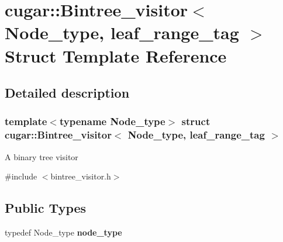 \hypertarget{structcugar_1_1_bintree__visitor_3_01_node__type_00_01leaf__range__tag_01_4}{}\section{cugar\+:\+:Bintree\+\_\+visitor$<$ Node\+\_\+type, leaf\+\_\+range\+\_\+tag $>$ Struct Template Reference}
\label{structcugar_1_1_bintree__visitor_3_01_node__type_00_01leaf__range__tag_01_4}


\subsection{Detailed description}
\subsubsection*{template$<$typename Node\+\_\+type$>$\newline
struct cugar\+::\+Bintree\+\_\+visitor$<$ Node\+\_\+type, leaf\+\_\+range\+\_\+tag $>$}

A binary tree visitor 

{\ttfamily \#include $<$bintree\+\_\+visitor.\+h$>$}

\subsection*{Public Types}
\begin{DoxyCompactItemize}
\item 
\mbox{\label{structcugar_1_1_bintree__visitor_3_01_node__type_00_01leaf__range__tag_01_4_aeb6107b5aa3f7271fc65e334aabf73ac}} 
typedef Node\+\_\+type {\bfseries node\+\_\+type}
\end{DoxyCompactItemize}

